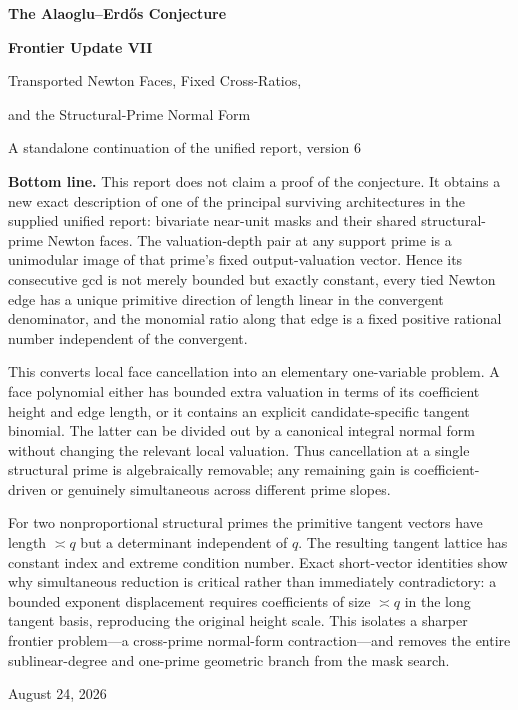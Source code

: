\documentclass[11pt,oneside]{article}
\theoremstyle{definition}
\theoremstyle{remark}
\begin{document}

\begin{titlepage}
\centering
\vspace*{0.7cm}
{\Huge\bfseries The Alaoglu--Erd\H{o}s Conjecture\par}
\vspace{0.25cm}
{\LARGE\bfseries Frontier Update VII\par}
\vspace{0.55cm}
{\LARGE Transported Newton Faces, Fixed Cross-Ratios,\par}
\vspace{0.12cm}
{\LARGE and the Structural-Prime Normal Form\par}
\vspace{0.75cm}
{\large A standalone continuation of the unified report, version 6\par}
\vfill
\begin{minipage}{0.91\textwidth}
\small
\textbf{Bottom line.}
This report does not claim a proof of the conjecture.  It obtains a new exact description of
one of the principal surviving architectures in the supplied unified report: bivariate
near-unit masks and their shared structural-prime Newton faces.  The valuation-depth pair at
any support prime is a unimodular image of that prime's fixed output-valuation vector.  Hence
its consecutive gcd is not merely bounded but exactly constant, every tied Newton edge has a
unique primitive direction of length linear in the convergent denominator, and the monomial
ratio along that edge is a fixed positive rational number independent of the convergent.

This converts local face cancellation into an elementary one-variable problem.  A face
polynomial either has bounded extra valuation in terms of its coefficient height and edge
length, or it contains an explicit candidate-specific tangent binomial.  The latter can be
divided out by a canonical integral normal form without changing the relevant local
valuation.  Thus cancellation at a single structural prime is algebraically removable; any
remaining gain is coefficient-driven or genuinely simultaneous across different prime
slopes.

For two nonproportional structural primes the primitive tangent vectors have length
$\asymp q$ but a determinant independent of $q$.  The resulting tangent lattice has constant
index and extreme condition number.  Exact short-vector identities show why simultaneous
reduction is critical rather than immediately contradictory: a bounded exponent displacement
requires coefficients of size $\asymp q$ in the long tangent basis, reproducing the original
height scale.  This isolates a sharper frontier problem---a cross-prime normal-form
contraction---and removes the entire sublinear-degree and one-prime geometric branch from the
mask search.
\end{minipage}
\vfill
{\large August 24, 2026\par}
\end{titlepage}
\end{document}
